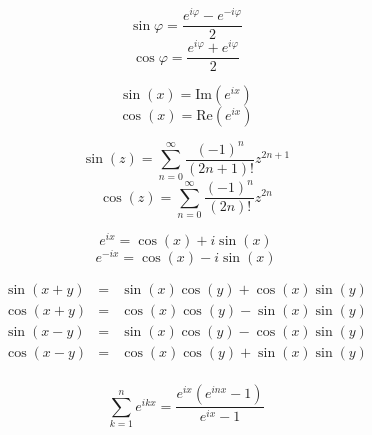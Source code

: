 \begin{multicols}{2}

$$\sin \varphi = \frac{e^{i \varphi} - e^{-i \varphi}}{2}$$
$$\cos \varphi = \frac{e^{i \varphi} + e^{i \varphi}}{2}$$

$$\sin (x) = \mathrm{Im} (e^{ix})$$
$$\cos (x) = \mathrm{Re} (e^{ix})$$

$$\sin (z) = \sum_{n=0}^\infty \frac{(-1)^n}{(2n + 1)!} z^{2n+1}$$
$$\cos (z) = \sum_{n=0}^\infty \frac{(-1)^n}{(2n)!} z^{2n}$$

$$e^{ix} = \cos (x) + i \sin (x)$$
$$e^{-ix} = \cos (x) - i \sin (x)$$

\end{multicols}

\begin{eqnarray*}
\sin (x + y) & = & \sin (x) \cos (y) + \cos (x) \sin (y) \\
\cos (x + y) & = & \cos (x) \cos (y) - \sin (x) \sin (y) \\
\sin (x - y) & = & \sin (x) \cos (y) - \cos (x) \sin (y) \\
\cos (x - y) & = & \cos (x) \cos (y) + \sin (x) \sin (y) \\
\end{eqnarray*}

$$\sum_{k=1}^n e^{ikx} = \frac{e^{ix} \left( e^{inx} - 1 \right)}{e^{ix} - 1}$$

